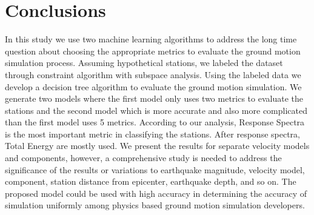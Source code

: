 
\section{Conclusions}

In this study we use two machine learning algorithms to address the long time question about choosing the appropriate metrics to evaluate the ground motion simulation process. Assuming hypothetical stations, we labeled the dataset through constraint \kmeans{} algorithm with subspace analysis. Using the labeled data we develop a decision tree algorithm to evaluate the ground motion simulation. We generate two models where the first model only uses two metrics to evaluate the stations and the second model which is more accurate and also more complicated than the first model uses 5 metrics. According to our analysis, Response Spectra is the most important metric in classifying the stations. After response spectra, Total Energy are mostly used. We present the results for separate velocity models and components, however, a comprehensive study is needed to address the significance of the results or variations to earthquake magnitude, velocity model, component, station distance from epicenter, earthquake depth, and so on. The proposed model could be used with high accuracy in determining the accuracy of simulation uniformly among physics based ground motion simulation developers.  
